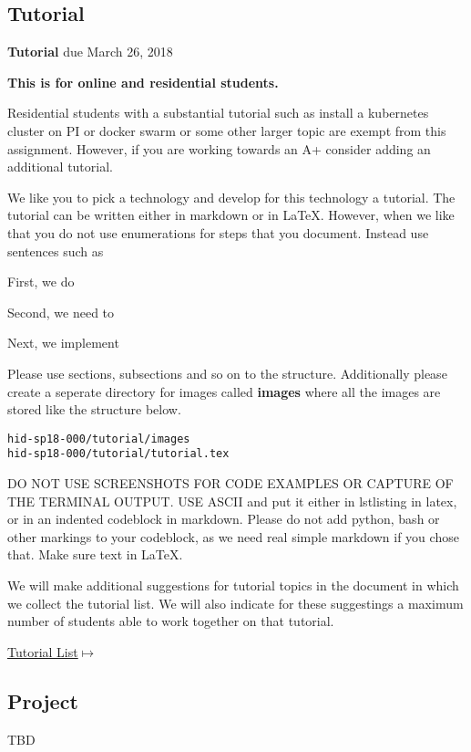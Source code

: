 \subsection{Tutorial}
\label{E:616-tutorial}

\begin{exercise} {\bf Tutorial} due March 26, 2018

{\bf This is for online and residential students.}

Residential students with a substantial tutorial such as install a
kubernetes cluster on PI or docker swarm or some other larger topic
are exempt from this assignment. However, if you are working towards
an A+ consider adding an additional tutorial.

 
We like you to pick a technology and develop for this technology a
tutorial. The tutorial can be written either in markdown or in
LaTeX. However, when we like that you do not use enumerations for
steps that you document. Instead use sentences such as
 
First, we do 
 
Second, we need to
 
Next, we implement
 
Please use sections, subsections and so on to the
structure. Additionally please create a seperate directory for images
called {\bf images} where all the images are stored like the structure
below. 

\begin{lstlisting}
hid-sp18-000/tutorial/images
hid-sp18-000/tutorial/tutorial.tex
\end{lstlisting}
 
DO NOT USE SCREENSHOTS FOR CODE EXAMPLES OR CAPTURE OF THE TERMINAL
OUTPUT.  USE ASCII and put it either in lstlisting in latex, or in an
indented codeblock in markdown. Please do not add python, bash or
other markings to your codeblock, as we need real simple markdown if
you chose that. Make sure text in LaTeX.

 
We will make additional suggestions for tutorial topics in the
document in which we collect the tutorial list. We will also indicate
for these suggestings a maximum number of students able to work
together on that tutorial.

{\hfill
  \href{https://docs.google.com/document/d/1L2-wYc7S7hb5u6ZNtKpTvlXqKMkqq-B38hlaBCw-eww/edit?usp=sharing}{Tutorial
    List$\mapsto$}}



\end{exercise} 

\subsection{Project}
\label{E:project}


\begin{exercise} 

TBD

\end{exercise} 

